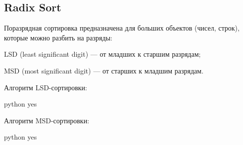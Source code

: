 \subsection{Radix Sort}

{\bold Поразрядная сортировка} предназначена для больших объектов {\ital\color{desc} (чисел, строк)}, которые можно разбить на {\ital разряды}:
\begin{list*}
\item LSD {\ital (least significant digit)} --- от младших к старшим разрядам;
\item MSD {\ital (most significant digit)} --- от старших к младшим разрядам.
\end{list*}
{\bold Алгоритм} LSD-сортировки:
\begin{code}{python}
yes
\end{code}
{\bold Алгоритм} MSD-сортировки:
\begin{code}{python}
yes
\end{code}
